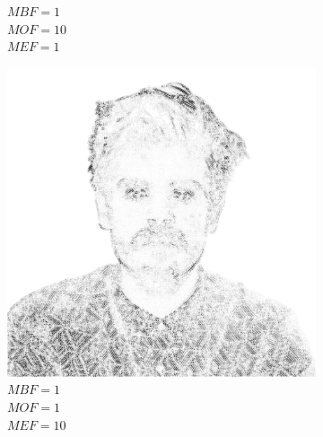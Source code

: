 \begin{figure}[H]
\begin{subfigure}{0.32\textwidth}
        \caption{\(MBF = 1\) \\ \(MOF = 10\) \\ \(MEF = 1\)}
        \label{mine-param-taco-e}
    \end{subfigure}
    \begin{subfigure}{0.32\textwidth}
        \centering
        \includegraphics[width = \textwidth]{img/4-mine/taco-mask/taco_mask_c20_inv0_bg1_obj1_ed10.png}
        \caption{\(MBF = 1\) \\ \(MOF = 1\) \\ \(MEF = 10\)}
        \label{mine-param-taco-f}
    \end{subfigure}\\
    \begin{subfigure}{0.32\textwidth}
        \centering

\end{subfigure}
\end{figure}
